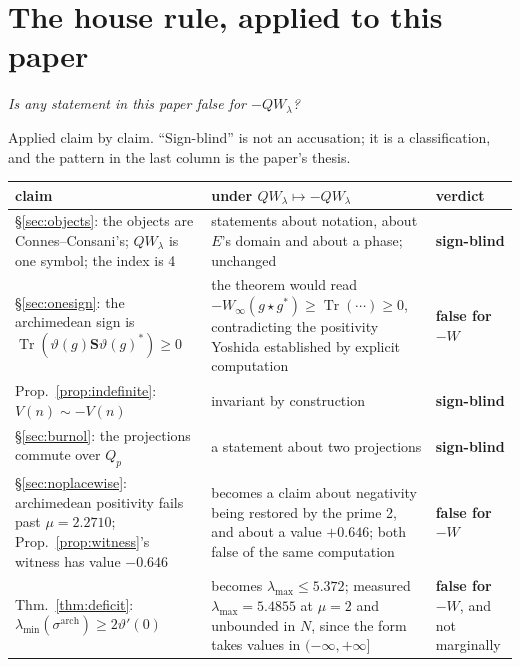 \documentclass[11pt,a4paper]{article}
\theoremstyle{plain}
\theoremstyle{definition}
\theoremstyle{remark}
\newcommand{\R}{\mathbb{R}}
\newcommand{\Z}{\mathbb{Z}}
\newcommand{\Q}{\mathbb{Q}}
\newcommand{\A}{\mathbb{A}}
\newcommand{\E}{\mathcal{E}}
\newcommand{\F}{\mathcal{F}}
\newcommand{\Sonin}{\mathbf{S}}
\newcommand{\QW}{QW}
\def\QW{QW}\def\E{E}\def\F{F}\def\R{R}\def\Q{Q}\def\Z{Z}\def\A{A}%
\begin{document}
\section{The house rule, applied to this paper}
\label{sec:houserule}

\begin{center}
\emph{Is any statement in this paper false for $-\QW_\lambda$?}
\end{center}

\noindent Applied claim by claim.  ``Sign-blind'' is not an accusation; it is a
classification, and the pattern in the last column is the paper's thesis.

\begin{center}\small
\begin{tabular}{@{}p{}p{}p{}@{}}
\hline
claim & under $\QW_\lambda\mapsto-\QW_\lambda$ & verdict \\
\hline
\S\ref{sec:objects}: the objects are Connes--Consani's; $\QW_\lambda$ is one
symbol; the index is 4
& statements about notation, about $\E$'s domain and about a phase; unchanged
& \textbf{sign-blind} \\
\S\ref{sec:onesign}: the archimedean sign is
$\operatorname{Tr}(\vartheta(g)\Sonin\vartheta(g)^*)\ge0$
& the theorem would read $-W_\infty(g\star g^*)\ge\operatorname{Tr}(\cdots)\ge0$,
contradicting the positivity Yoshida established by explicit computation
& \textbf{false for $-W$} \\
Prop.~\ref{prop:indefinite}: $V(n)\sim-V(n)$
& invariant by construction
& \textbf{sign-blind} \\
\S\ref{sec:burnol}: the projections commute over $\Q_p$
& a statement about two projections
& \textbf{sign-blind} \\
\S\ref{sec:noplacewise}: archimedean positivity fails past $\mu=2.2710$;
Prop.~\ref{prop:witness}'s witness has value $-0.646$
& becomes a claim about negativity being restored by the prime 2, and about a
value $+0.646$; both false of the same computation
& \textbf{false for $-W$} \\
Thm.~\ref{thm:deficit}: $\lambda_{\min}(\sigma^{\mathrm{arch}})\ge2\vartheta'(0)$
& becomes $\lambda_{\max}\le5.372$; measured $\lambda_{\max}=5.4855$ at $\mu=2$
and unbounded in $N$, since the form takes values in $(-\infty,+\infty]$
& \textbf{false for $-W$}, and not marginally \\

\end{tabular}
\end{center}
\end{document}
